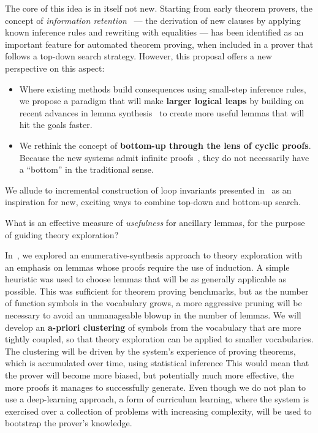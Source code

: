 The core of this idea is in itself not new.
Starting from early theorem provers, the concept of \emph{information retention}~\cite{JAR1995:Voronkov} --- the derivation of new clauses by applying known inference rules and rewriting with equalities --- has been identified as an important feature for automated theorem proving, \esp when included in a prover that follows a top-down search strategy.
However, this proposal offers a new perspective on this aspect:
\begin{itemize}
  \item Where existing methods build consequences using small-step inference rules, we propose a paradigm that will make \textbf{larger logical leaps} by building on recent advances in lemma synthesis~\cite{CADE2013:Claessen,ITP2017:Johansson,arXiv2020:Singher,CAV2021:Murali} to create more useful lemmas that will hit the goals faster.
  \item We rethink the concept of \textbf{bottom-up through the lens of cyclic proofs}.
  Because the new systems admit infinite proofs~\cite{LICS2007:Brotherston,CPP2017:Rowe,IJCAR2020:Cohen}, they do not necessarily have a ``bottom'' in the traditional sense.
\end{itemize}

We allude to incremental construction of loop invariants presented in~\cite{arXiv2020:Padon,FAC2008:Bradley} as an inspiration for new, exciting ways to combine top-down and bottom-up search.


\begin{researchquestion}
What is an effective measure of \emph{usefulness} for ancillary lemmas, for the purpose of guiding theory exploration?
\end{researchquestion}

In~\cite{arXiv2020:Singher}, we explored an enumerative-synthesis approach to theory exploration with an emphasis on lemmas whose proofs require the use of induction.
A simple heuristic was used to choose lemmas that will be as generally applicable as possible.
This was sufficient for theorem proving benchmarks, but as the number of function symbols in the vocabulary grows, a more aggressive pruning will be necessary to avoid an unmanageable blowup in the number of lemmas.
We will develop an \textbf{a-priori clustering} of symbols from the vocabulary that are more tightly coupled, so that theory exploration can be applied to smaller vocabularies.
The clustering will be driven by the system's experience of proving theorems, which is accumulated over time, using statistical inference
This would mean that the prover will become more biased, but potentially much more effective, the more proofs it manages to successfully generate.
Even though we do not plan to use a deep-learning approach, a form of curriculum learning, where the system is exercised over a collection of problems with increasing complexity, will be used to bootstrap the prover's knowledge.

